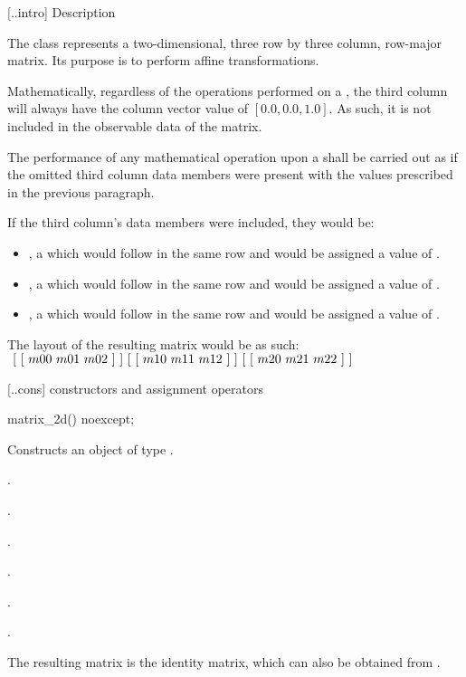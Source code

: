  [\iotwod.\matrixtwod.intro] { Description}

\pnum
{}%
The  class represents a two-dimensional, three row by three column, row-major matrix. Its purpose is to perform affine transformations.

\pnum
Mathematically, regardless of the operations performed on a , the third column will always have the column vector value of $[0.0, 0.0, 1.0]$. As such, it is not included in the observable data of the matrix.

\pnum
The performance of any mathematical operation upon a  shall be carried out as if the omitted third column data members were present with the values prescribed in the previous paragraph.

\pnum
\enternote
If the third column's data members were included, they would be:

\begin{itemize}
	\item {}, a  which would follow  in the same row and would be assigned a value of .
	
	\item {}, a  which would follow  in the same row and would be assigned a value of .
	
	\item {}, a  which would follow  in the same row and would be assigned a value of .
\end{itemize}

\pnum
The layout of the resulting matrix would be as such: \\
$
~[~[~m00~m01~m02~]~] \\
~[~[~m10~m11~m12~]~] \\
~[~[~m20~m21~m22~]~]$
\exitnote

 [\iotwod.\matrixtwod.cons] { constructors and assignment operators}

\begin{itemdecl}
	matrix_2d() noexcept;
\end{itemdecl}
\begin{itemdescr}
	\pnum
	\effects
	Constructs an object of type .
	
	\pnum
	\postconditions
	.
	
	\pnum
	.
	
	\pnum
	.
	
	\pnum
	.
	
	\pnum
	.
	
	\pnum
	.
	
	\pnum
	\realnote
	The resulting matrix is the identity matrix, which can also be obtained from .

\end{itemdescr}

